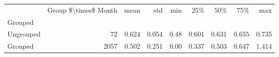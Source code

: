 \begin{tabular}{lrrrrrrrr}
\toprule
{} &  Group \$\textbackslash times\$ Month &   mean &    std &   min &    25\% &    50\% &    75\% &    max \\
Grouped   &                       &        &        &       &        &        &        &        \\
\midrule
Ungrouped &                    72 &  0.624 &  0.054 &  0.48 &  0.601 &  0.631 &  0.655 &  0.735 \\
Grouped   &                  2057 &  0.502 &  0.251 &  0.00 &  0.337 &  0.503 &  0.647 &  1.414 \\
\bottomrule
\end{tabular}

